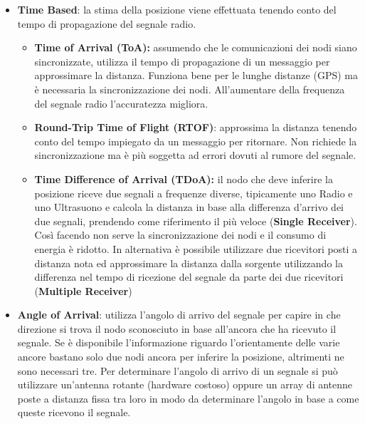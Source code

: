 \begin{itemize}
\item \textbf{Time Based}: la stima della posizione viene effettuata tenendo
  conto del tempo di propagazione del segnale radio.

  \begin{itemize}
  \item \textbf{Time of Arrival (ToA):} assumendo che le comunicazioni dei
    nodi siano sincronizzate, utilizza il tempo di propagazione di un
    messaggio per approssimare la distanza. Funziona bene per le lunghe
    distanze (GPS) ma è necessaria la sincronizzazione dei nodi.
    All'aumentare della frequenza del segnale radio l'accuratezza
    migliora.

  \item \textbf{Round-Trip Time of Flight (RTOF)}: approssima la distanza
    tenendo conto del tempo impiegato da un messaggio per ritornare. Non
    richiede la sincronizzazione ma è più soggetta ad errori dovuti al
    rumore del segnale.

  \item \textbf{Time Difference of Arrival (TDoA):} il nodo che deve
    inferire la posizione riceve due segnali a frequenze diverse,
    tipicamente uno Radio e uno Ultrasuono e calcola la distanza in base
    alla differenza d'arrivo dei due segnali, prendendo come riferimento
    il più veloce (\textbf{Single Receiver}). Così facendo non serve la
    sincronizzazione dei nodi e il consumo di energia è ridotto. In
    alternativa è possibile utilizzare due ricevitori posti a distanza
    nota ed approssimare la distanza dalla sorgente utilizzando la
    differenza nel tempo di ricezione del segnale da parte dei due
    ricevitori (\textbf{Multiple Receiver})

  \end{itemize}
\item \textbf{Angle of Arrival}: utilizza l'angolo di arrivo del segnale per
  capire in che direzione si trova il nodo sconosciuto in base
  all'ancora che ha ricevuto il segnale. Se è disponibile l'informazione
  riguardo l'orientamente delle varie ancore bastano solo due nodi
  ancora per inferire la posizione, altrimenti ne sono necessari tre.
  Per determinare l'angolo di arrivo di un segnale si può utilizzare
  un'antenna rotante (hardware costoso) oppure un array di antenne poste
  a distanza fissa tra loro in modo da determinare l'angolo in base a
  come queste ricevono il segnale.

\end{itemize}

